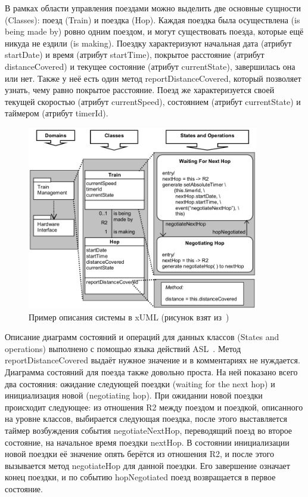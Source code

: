 \documentclass[a5paper]{article}
\begin{document}
В рамках области управления поездами можно выделить две основные сущности (Classes): поезд (Train) и поездка (Hop). Каждая поездка была осуществлена (is being made by) ровно одним поездом, и могут существовать поезда, которые ещё никуда не ездили (is making). Поездку характеризуют начальная дата (атрибут startDate) и время (атрибут startTime), покрытое расстояние (атрибут distanceCovered) и текущее состояние (атрибут currentState), завершилась она или нет. Также у неё есть один метод reportDistanceCovered, который позволяет узнать, чему равно покрытое расстояние. Поезд же характеризуется своей текущей скоростью (атрибут currentSpeed), состоянием (атрибут currentState) и таймером (атрибут timerId).

\begin{figure} [ht]
  \begin{center}
    \includegraphics[width=0.9\textwidth]{xuml-example.png}
    \caption{Пример описания системы в xUML (рисунок взят из~\cite{xuml4})}
    \label{fig1}
  \end{center}
\end{figure}

Описание диаграмм состояний и операций для данных классов (States and operations) выполнено с помощью языка действий ASL~\cite{al2}. Метод reportDistanceCovered выдаёт нужное значение и в комментариях не нуждается. Диаграмма состояний для поезда также довольно проста. На ней показано всего два состояния: ожидание следующей поездки (waiting for the next hop) и инициализация новой (negotiating hop). При ожидании новой поездки происходит следующее: из отношения R2 между поездом и  поездкой, описанного на уровне классов, выбирается следующая поездка, после этого выставляется таймер возбуждения события negotiateNextHop, переводящий поезд во второе состояние, на начальное время поездки nextHop. В состоянии инициализации новой поездки её значение опять берётся из отношения R2, и после этого вызывается метод negotiateHop для данной поездки. Его завершение означает конец поездки, и по событию hopNegotiated поезд возвращается в первое состояние.
\end{document}
